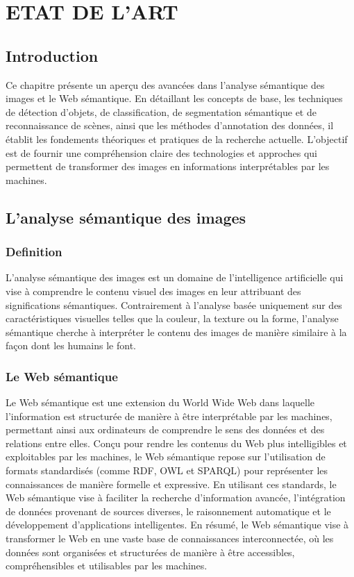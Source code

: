 \chapter{ETAT DE L'ART}
\begin{spacing}{1.2}
\minitoc
\thispagestyle{MyStyle}
\end{spacing}
\newpage

\section{Introduction}
Ce chapitre présente un aperçu des avancées dans l'analyse sémantique des images et le Web sémantique. En détaillant les concepts de base, les techniques de détection d'objets, de classification, de segmentation sémantique et de reconnaissance de scènes, ainsi que les méthodes d'annotation des données, il établit les fondements théoriques et pratiques de la recherche actuelle. L'objectif est de fournir une compréhension claire des technologies et approches qui permettent de transformer des images en informations interprétables par les machines.

\section{L'analyse sémantique des images}

\subsection{Definition}
\quad L'analyse sémantique des images est un domaine de l'intelligence artificielle qui vise à comprendre le contenu visuel des images en leur attribuant des significations sémantiques. Contrairement à l'analyse basée uniquement sur des caractéristiques visuelles telles que la couleur, la texture ou la forme, l'analyse sémantique cherche à interpréter le contenu des images de manière similaire à la façon dont les humains le font.

\subsection{Le Web sémantique}
\quad Le Web sémantique est une extension du World Wide Web dans laquelle l'information est structurée de manière à être interprétable par les machines, permettant ainsi aux ordinateurs de comprendre le sens des données et des relations entre elles. Conçu pour rendre les contenus du Web plus intelligibles et exploitables par les machines, le Web sémantique repose sur l'utilisation de formats standardisés (comme RDF, OWL et SPARQL) pour représenter les connaissances de manière formelle et expressive. En utilisant ces standards, le Web sémantique vise à faciliter la recherche d'information avancée, l'intégration de données provenant de sources diverses, le raisonnement automatique et le développement d'applications intelligentes. En résumé, le Web sémantique vise à transformer le Web en une vaste base de connaissances interconnectée, où les données sont organisées et structurées de manière à être accessibles, compréhensibles et utilisables par les machines.

